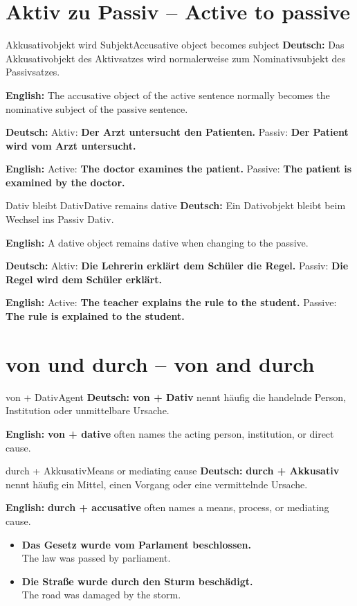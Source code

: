 \documentclass[a4paper,11pt]{article}
\newcommand{\GermanText}[1]{\textbf{Deutsch: }#1\par}
\newcommand{\EnglishText}[1]{{\small\color{SoftGray}\textbf{English: }#1\par}}
\newcommand{\ExampleItem}[2]{\item \textbf{#1}\\{\small\color{SoftGray}#2}}
\begin{document}
\section{Aktiv zu Passiv -- Active to passive}
\begin{grammarentry}{Akkusativobjekt wird Subjekt}{Accusative object becomes subject}
\GermanText{Das Akkusativobjekt des Aktivsatzes wird normalerweise zum Nominativsubjekt des Passivsatzes.}
\EnglishText{The accusative object of the active sentence normally becomes the nominative subject of the passive sentence.}
\GermanText{Aktiv: \textbf{Der Arzt untersucht den Patienten.} Passiv: \textbf{Der Patient wird vom Arzt untersucht.}}
\EnglishText{Active: \textbf{The doctor examines the patient.} Passive: \textbf{The patient is examined by the doctor.}}
\end{grammarentry}
\begin{grammarentry}{Dativ bleibt Dativ}{Dative remains dative}
\GermanText{Ein Dativobjekt bleibt beim Wechsel ins Passiv Dativ.}
\EnglishText{A dative object remains dative when changing to the passive.}
\GermanText{Aktiv: \textbf{Die Lehrerin erklärt dem Schüler die Regel.} Passiv: \textbf{Die Regel wird dem Schüler erklärt.}}
\EnglishText{Active: \textbf{The teacher explains the rule to the student.} Passive: \textbf{The rule is explained to the student.}}
\end{grammarentry}

\section{von und durch -- von and durch}
\begin{grammarentry}{von + Dativ}{Agent}
\GermanText{\textbf{von + Dativ} nennt häufig die handelnde Person, Institution oder unmittelbare Ursache.}
\EnglishText{\textbf{von + dative} often names the acting person, institution, or direct cause.}
\end{grammarentry}
\begin{grammarentry}{durch + Akkusativ}{Means or mediating cause}
\GermanText{\textbf{durch + Akkusativ} nennt häufig ein Mittel, einen Vorgang oder eine vermittelnde Ursache.}
\EnglishText{\textbf{durch + accusative} often names a means, process, or mediating cause.}
\end{grammarentry}
\begin{exbox}\begin{itemize}
\ExampleItem{Das Gesetz wurde vom Parlament beschlossen.}{The law was passed by parliament.}
\ExampleItem{Die Straße wurde durch den Sturm beschädigt.}{The road was damaged by the storm.}
\end{itemize}\end{exbox}
\end{document}
